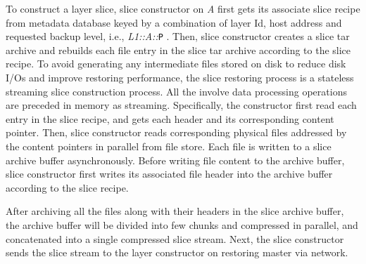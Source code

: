 To construct a layer slice,
slice constructor on \emph{A} first gets its associate slice recipe from metadata database 
keyed by a combination of  layer Id, host address and requested backup level, i.e., \emph{L1::A::}\texttt{P} .
Then, 
slice constructor creates a slice tar archive 
and 
rebuilds each file entry in the slice tar archive according to the slice recipe.
To avoid generating any intermediate files stored on disk to reduce disk I/Os
and improve restoring performance,
the
slice restoring process is a stateless streaming slice construction process.
All the involve data processing operations are preceded in memory as streaming. 
Specifically,
the constructor first read each entry in the slice recipe,
and gets each header and its corresponding content pointer.
Then, 
slice constructor reads corresponding physical files addressed by the content pointers
 in parallel from file store.%
Each file is written to a slice archive buffer asynchronously.
Before writing file content to the archive buffer, 
slice constructor first writes its
associated 
file header into the archive buffer according to the slice recipe.

After archiving all the files along with their headers
 in the slice archive buffer,
the archive buffer will be divided into few chunks and compressed in parallel,
and concatenated into a single compressed slice stream.
%
Next, the slice constructor sends the slice stream to the layer constructor on restoring master
via network.

 



